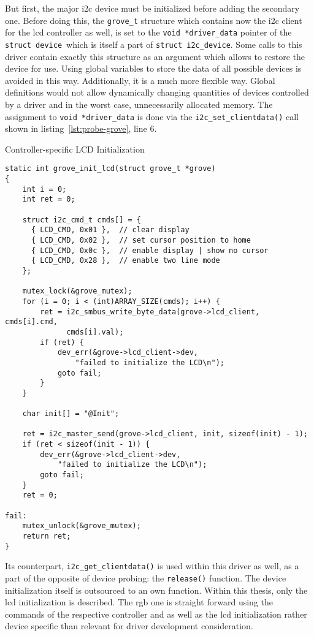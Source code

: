 But first, the major \ac{i2c} device must be initialized before adding the secondary one.
Before doing this, the \texttt{grove_t} structure which contains now the \ac{i2c} client for the \ac{lcd} controller as well, is set to the \texttt{void *driver_data} pointer of the \texttt{struct device}~which is itself a part of \texttt{struct i2c_device}.
Some calls to this driver contain exactly this structure as an argument which allows to restore the device for use.
Using global variables to store the data of all possible devices is avoided in this way.
Additionally, it is a much more flexible way.
Global definitions would not allow dynamically changing quantities of devices controlled by a driver and in the worst case, unnecessarily allocated memory.
The assignment to \texttt{void *driver_data} is done via the \texttt{i2c_set_clientdata()} call shown in listing~\ref{lst:probe-grove}, line 6.
%
\begin{listing} [H]
    \caption{Controller-specific LCD Initialization}
    \label{lst:probe-lcdinit}
    \begin{verbatim}
static int grove_init_lcd(struct grove_t *grove)
{
    int i = 0;
    int ret = 0;

    struct i2c_cmd_t cmds[] = {
      { LCD_CMD, 0x01 },  // clear display
      { LCD_CMD, 0x02 },  // set cursor position to home
      { LCD_CMD, 0x0c },  // enable display | show no cursor
      { LCD_CMD, 0x28 },  // enable two line mode
    };

    mutex_lock(&grove_mutex);
    for (i = 0; i < (int)ARRAY_SIZE(cmds); i++) {
        ret = i2c_smbus_write_byte_data(grove->lcd_client, cmds[i].cmd,
              cmds[i].val);
        if (ret) {
            dev_err(&grove->lcd_client->dev,
                "failed to initialize the LCD\n");
            goto fail;
        }
    }

    char init[] = "@Init";

    ret = i2c_master_send(grove->lcd_client, init, sizeof(init) - 1);
    if (ret < sizeof(init - 1)) {
        dev_err(&grove->lcd_client->dev,
            "failed to initialize the LCD\n");
        goto fail;
    }
    ret = 0;

fail:
    mutex_unlock(&grove_mutex);
    return ret;
}
    \end{verbatim}
\end{listing}
%
Its counterpart, \texttt{i2c_get_clientdata()} is used within this driver as well, as a part of the opposite of device probing: the \texttt{release()} function. 
The device initialization itself is outsourced to an own function.
Within this thesis, only the \ac{lcd} initialization is described.
The \ac{rgb} one is straight forward using the commands of the respective controller and as well as the \ac{lcd} initialization rather device specific than relevant for driver development consideration.

